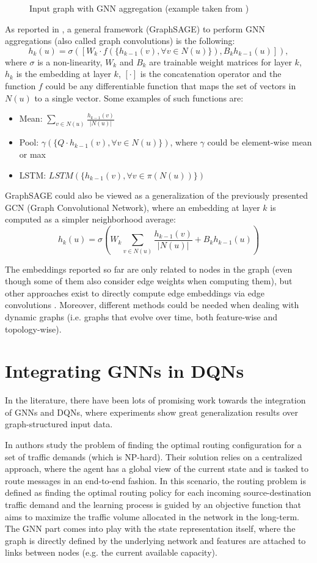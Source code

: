 \documentclass[a4paper,10pt]{report}
\begin{document}
\begin{figure}[!h]
	\caption{Input graph with GNN aggregation (example taken from \cite{gnn-lectures})}
	\label{fig:gnn-drawing}
\end{figure}
\clearpage

As reported in \cite{graphsage}, a general framework (GraphSAGE) to perform GNN aggregations (also called graph convolutions) is the following:
$$
h_k(u)=\sigma\left(\left[W_k \cdot f(\{h_{k-1}(v), \forall v \in N(u)\}), B_k h_{k-1}(u)\right]\right),
$$
where $\sigma$ is a non-linearity, $W_k$ and $B_k$ are trainable weight matrices for layer $k$, $h_k$ is the embedding at layer $k$, $[\cdot]$ is the concatenation operator and the function $f$ could be any differentiable function that maps the set of vectors in $N(u)$ to a single vector. Some examples of such functions are:
\begin{itemize}
	\item Mean: $\sum_{v\in N(u)}\frac{h_{k-1}(v)}{|N(u)|}$
	\item Pool: $\gamma(\{Q\cdot h_{k-1}(v), \forall v \in N(u)\})$, where $\gamma$ could be element-wise mean or max
	\item LSTM: $LSTM(\{h_{k-1}(v), \forall v \in \pi(N(u))\})$
\end{itemize}

GraphSAGE could also be viewed as a generalization of the previously presented GCN \cite{gcn} (Graph Convolutional Network), where an embedding at layer $k$ is computed as a simpler neighborhood average:
$$
h_k(u)=\sigma\left(W_k\sum_{v\in N(u)}\frac{h_{k-1}(v)}{|N(u)|}+B_k h_{k-1}(u)\right)
$$

The embeddings reported so far are only related to nodes in the graph (even though some of them also consider edge weights when computing them), but other approaches exist to directly compute edge embeddings via edge convolutions \cite{edge-conv-gnn}. Moreover, different methods could be needed when dealing with dynamic graphs (i.e. graphs that evolve over time, both feature-wise and topology-wise).


\section{Integrating GNNs in DQNs}
In the literature, there have been lots of promising work towards the integration of GNNs and DQNs, where experiments show great generalization results over graph-structured input data.

In \cite{dqn-gnn-routing} authors study the problem of finding the optimal routing configuration for a set of traffic demands (which is NP-hard). Their solution relies on a centralized approach, where the agent has a global view of the current state and is tasked to route messages in an end-to-end fashion. In this scenario, the routing problem is defined as finding the optimal routing policy for each incoming source-destination traffic demand and the learning process is guided by an objective function that aims to maximize the traffic volume allocated in the network in the long-term. The GNN part comes into play with the state representation itself, where the graph is directly defined by the underlying network and features are attached to links between nodes (e.g. the current available capacity).
\end{document}
